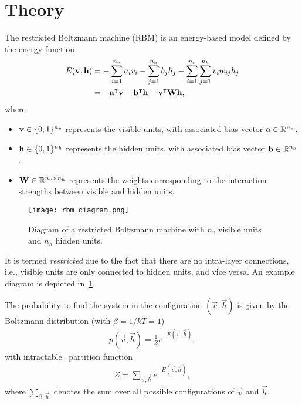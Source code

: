 \section{Theory}
The restricted Boltzmann machine (RBM) is an energy-based model defined by the energy function~\cite{goodfellow_deep_learning}
\begin{align}
\begin{split}
    \label{eq:rbm_energy}
    E(\mathbf{v}, \mathbf{h})
        &= -\sum_{i=1}^{n_v} a_i v_i - \sum_{j=1}^{n_h} b_j h_j - \sum_{i=1}^{n_v} \sum_{j=1}^{n_h} v_i w_{ij} h_j \\
        &= -\mathbf{a}^\intercal\mathbf{v} - \mathbf{b}^\intercal\mathbf{h} - \mathbf{v}^\intercal\mathbf{W}\mathbf{h},
\end{split}
\end{align}
where
\begin{itemize}
    \item \( \mathbf{v} \in \{0,1\}^{n_v} \) represents the visible units, with associated bias vector \( \mathbf{a} \in \mathbb{R}^{n_v} \).
    \item \( \mathbf{h} \in \{0,1\}^{n_h} \) represents the hidden units, with associated bias vector \( \mathbf{b} \in \mathbb{R}^{n_h} \).
    \item \( \mathbf{W} \in \mathbb{R}^{n_v \times n_h} \) represents the weights corresponding to the interaction strengths between visible and hidden units.
\end{itemize}

\begin{figure}[!htb]
    \begin{center}
        \texttt{[image: rbm\_diagram.png]}
    \end{center}
    \caption{Diagram of a restricted Boltzmann machine with \( n_v \) visible units and \( n_h \) hidden units.}
    \label{fig:rbm_diagram}
\end{figure}

It is termed \textit{restricted} due to the fact that there are no intra-layer connections, i.e., visible units are only connected to hidden units, and vice versa.
An example diagram is depicted in~\cref{fig:rbm_diagram}.

The probability to find the system in the configuration \( (\vec{v},\vec{h}) \) is given by the Boltzmann distribution (with \( \beta = 1/kT = 1 \))
\begin{align}
    \label{eq:rbm_joint_probability}
    p(\vec{v}, \vec{h}) = \frac{1}{Z} e^{-E(\vec{v},\vec{h})},
\end{align}
with intractable~\cite{long_servedio_2010} partition function
\begin{align}
    \label{eq:rbm_partition_function}
    Z = \sum_{\vec{v},\vec{h}} e^{-E(\vec{v},\vec{h})},
\end{align}
where \( \sum_{\vec{v},\vec{h}} \) denotes the sum over all possible configurations of \( \vec{v} \) and \( \vec{h} \).

